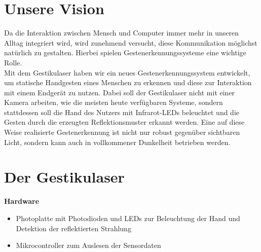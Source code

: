 \documentclass{sciposter}
\begin{document}
\begin{multicols}{3}
\setlength{\parindent}{2em}

\section{Unsere Vision}
\noindent
Da die Interaktion zwischen Mensch und Computer immer mehr in unseren Alltag integriert wird, wird zunehmend versucht, diese Kommunikation möglichst natürlich zu gestalten. Hierbei spielen Gestenerkennungssysteme eine wichtige Rolle. \\
Mit dem Gestikulaser haben wir ein neues Gestenerkennungssystem entwickelt, um statische Handgesten eines Menschen zu erkennen und diese zur Interaktion mit einem Endgerät zu nutzen. Dabei soll der Gestikulaser nicht mit einer Kamera arbeiten, wie die meisten heute verfügbaren Systeme, sondern stattdessen soll die Hand des Nutzers mit Infrarot-LEDs beleuchtet und die Gesten durch die erzeugten Reflektionsmuster erkannt werden. Eine auf diese Weise realisierte Gestenerkennung ist nicht nur robust gegenüber sichtbaren Licht, sondern kann auch in vollkommener Dunkelheit betrieben werden. \\


\section{Der Gestikulaser}
\noindent
\textbf{Hardware}
\begin{itemize}
	\item Photoplatte mit Photodioden und LEDs zur Beleuchtung der Hand und Detektion der reflektierten Strahlung
	\item Mikrocontroller zum Auslesen der Sensordaten
\end{itemize}


\end{multicols}
\end{document}
